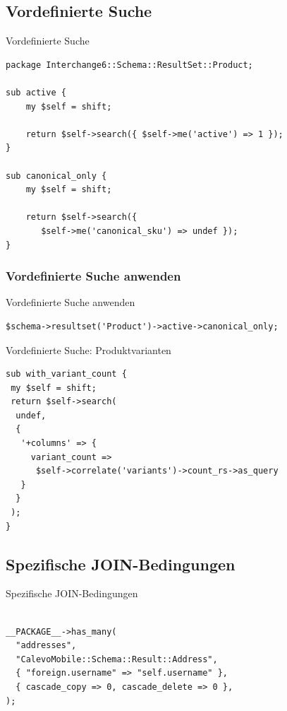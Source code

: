 \subsection{Vordefinierte Suche}

\begin{frame}[fragile]{Vordefinierte Suche}
\begin{lstlisting}
package Interchange6::Schema::ResultSet::Product;

sub active {
    my $self = shift;

    return $self->search({ $self->me('active') => 1 });
}

sub canonical_only {
    my $self = shift;

    return $self->search({ 
       $self->me('canonical_sku') => undef });
}

\end{lstlisting}
\end{frame}

\subsubsection{Vordefinierte Suche anwenden}

\begin{frame}[fragile]{Vordefinierte Suche anwenden}
\begin{lstlisting}
$schema->resultset('Product')->active->canonical_only;
\end{lstlisting}
\end{frame}

\begin{frame}[fragile]{Vordefinierte Suche: Produktvarianten}
\begin{lstlisting}
sub with_variant_count {
 my $self = shift;
 return $self->search(
  undef,
  {
   '+columns' => {
     variant_count =>
      $self->correlate('variants')->count_rs->as_query
   }
  }
 );
}
\end{lstlisting}
\end{frame}

\subsection{Spezifische JOIN-Bedingungen}

\begin{frame}[fragile]{Spezifische JOIN-Bedingungen}
\begin{lstlisting}

__PACKAGE__->has_many(
  "addresses",
  "CalevoMobile::Schema::Result::Address",
  { "foreign.username" => "self.username" },
  { cascade_copy => 0, cascade_delete => 0 },
);

\end{lstlisting}
\end{frame}


